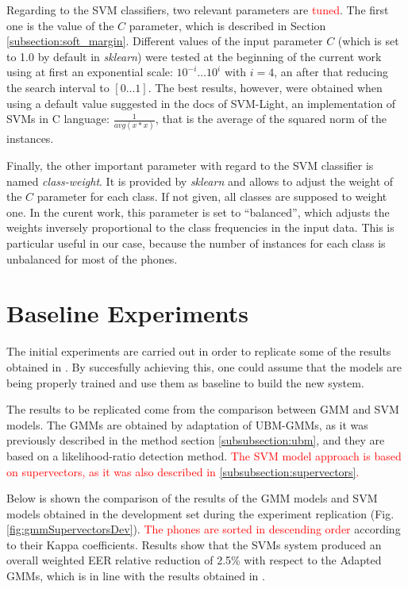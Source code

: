 Regarding to the SVM classifiers, two relevant parameters are \textcolor{red}{tuned}.
The first one is
the value of the $C$ parameter, which is described in Section
\ref{subsection:soft_margin}.
Different values of the input parameter $C$ (which is set to 1.0 by default
in \textit{sklearn})
were tested at the beginning of the
current work using at first an exponential scale:
$10^{-i} \ldots 10^{i}$ with $i=4$, an after that reducing the search interval to
$[0 \ldots 1]$. The best results, however, were obtained when using a default value
suggested in the docs of SVM-Light, an implementation of SVMs in C language: $\frac{1}{avg(x*x)}$,
that is the average of the squared norm of the instances.

Finally, the other important parameter with regard to the SVM classifier is named
\textit{class-weight}. It is provided by \textit{sklearn} and allows to
adjust the weight of the $C$ parameter for each class. If not given, all classes are supposed
to weight one. In the curent work, this parameter is set to ``balanced'', which adjusts
the weights inversely proportional to the class frequencies in the input data.
This is particular useful in our case, because the number of instances for each class is
unbalanced for most of the phones.

\section{Baseline Experiments}

The initial experiments are carried out in order to replicate some of
the results obtained in \cite{main}.
By succesfully achieving this, one could assume that the models are being properly trained
and use them as baseline to build the new system.

The results to be replicated come from the comparison between GMM and SVM models.
The GMMs are obtained by adaptation of UBM-GMMs, as it was previously described in
the method section \ref{subsubsection:ubm}, and they are based on
a likelihood-ratio detection method.
\textcolor{red}{The SVM model approach is based on supervectors, as it was also described
in \ref{subsubsection:supervectors}.}

Below is shown the
comparison of the results of the GMM models and
SVM models obtained in the development set during the experiment
replication (Fig. \ref{fig:gmmSupervectorsDev}).
\textcolor{red}{The phones are sorted in descending order} according to their Kappa coefficients.
Results show that the SVMs system produced an overall weighted EER relative reduction of 2.5\% with
respect to the Adapted GMMs, which is in line with the results obtained
in \cite{main}.

